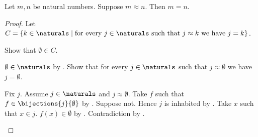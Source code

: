 \begin{theorem}\label{natural_equinumerous_unique}
    Let $m,n$ be natural numbers.
    Suppose $m\approx n$.
    Then $m=n$.
\end{theorem}
\begin{proof}
    Let $C=\{k\in\naturals\mid
        \text{for every $j\in\naturals$ such that $j\approx k$
            we have $j=k$}\}$.

    Show that $\emptyset\in C$.
    \begin{subproof}
        $\emptyset\in\naturals$ by .
        Show that for every $j\in\naturals$ such that
            $j\approx\emptyset$ we have $j=\emptyset$.
        \begin{subproof}
            Fix $j$.
            Assume $j\in\naturals$ and $j\approx\emptyset$.
            Take $f$ such that $f\in\bijections{j}{\emptyset}$
                by .
            Suppose not.
            Hence $j$ is inhabited by .
            Take $x$ such that $x\in j$.
            $f(x)\in\emptyset$
                by .
            Contradiction by .
        \end{subproof}
    \end{subproof}


\end{proof}
